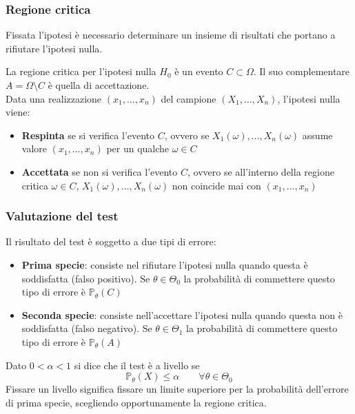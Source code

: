 \subsubsection{Regione critica}
Fissata l'ipotesi è necessario determinare un insieme di risultati che portano a rifiutare l'ipotesi nulla.
\begin{definition}
	La regione critica per l'ipotesi nulla $H_0$ è un evento $C \subset \Omega$. Il suo complementare $A = \Omega \setminus C$ è quella di accettazione.\\
	Data una realizzazione $(x_1, \ldots, x_n)$ del campione $(X_1, \ldots, X_n)$, l'ipotesi nulla viene:
	\begin{itemize}
		\item \textbf{Respinta} se si verifica l'evento $C$, ovvero se $X_1(\omega), \ldots, X_n(\omega)$ assume valore $(x_1, \ldots, x_n)$ per un qualche $\omega \in C$
		\item \textbf{Accettata} se non si verifica l'evento $C$, ovvero se all'interno della regione critica $\omega \in C$, $X_1(\omega), \ldots, X_n(\omega)$ non coincide mai con $(x_1, \ldots, x_n)$
	\end{itemize}
\end{definition}

\subsubsection{Valutazione del test}
Il risultato del test è soggetto a due tipi di errore:
\begin{itemize}
	\item \textbf{Prima specie}: consiste nel rifiutare l'ipotesi nulla quando questa è soddisfatta (falso positivo). Se $\theta \in \Theta_0$ la probabilità di commettere questo tipo di errore è $\mathbb{P}_\theta(C)$
	\item \textbf{Seconda specie}: consiste nell'accettare l'ipotesi nulla quando questa non è soddisfatta (falso negativo). Se $\theta \in \Theta_1$ la probabilità di commettere questo tipo di errore è $\mathbb{P}_\theta(A)$
\end{itemize}

\begin{definition}
	Dato $0 < \alpha < 1$ si dice che il test è a livello se
	\begin{equation}
		\mathbb{P}_\theta(X) \leq \alpha \quad\quad \forall \theta \in \Theta_0
	\end{equation}
	Fissare un livello significa fissare un limite superiore per la probabilità dell'errore di prima specie, scegliendo opportunamente la regione critica.
\end{definition}

